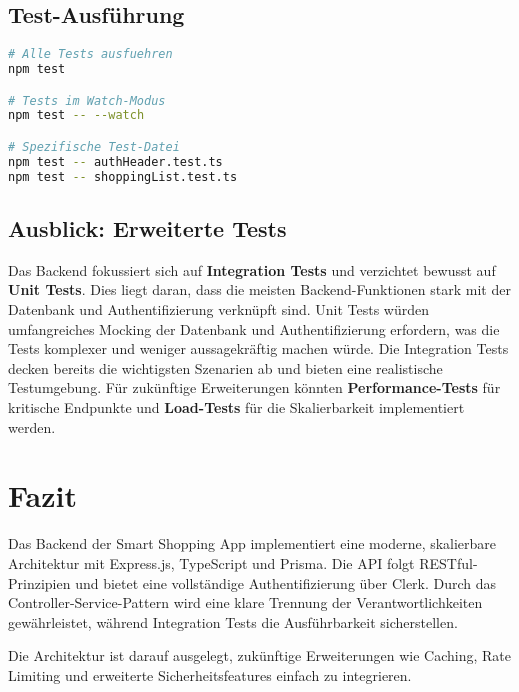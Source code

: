 \subsection{Test-Ausführung}

\begin{lstlisting}[language=bash,caption={Test-Befehle}]
# Alle Tests ausfuehren
npm test

# Tests im Watch-Modus
npm test -- --watch

# Spezifische Test-Datei
npm test -- authHeader.test.ts
npm test -- shoppingList.test.ts
\end{lstlisting}

\subsection{Ausblick: Erweiterte Tests}

Das Backend fokussiert sich auf \textbf{Integration Tests} und verzichtet bewusst auf \textbf{Unit Tests}. Dies liegt daran, dass die meisten Backend-Funktionen stark mit der Datenbank und Authentifizierung verknüpft sind. Unit Tests würden umfangreiches Mocking der Datenbank und Authentifizierung erfordern, was die Tests komplexer und weniger aussagekräftig machen würde. Die Integration Tests decken bereits die wichtigsten Szenarien ab und bieten eine realistische Testumgebung. Für zukünftige Erweiterungen könnten \textbf{Performance-Tests} für kritische Endpunkte und \textbf{Load-Tests} für die Skalierbarkeit implementiert werden.

\section{Fazit}

Das Backend der Smart Shopping App implementiert eine moderne, skalierbare Architektur mit Express.js, TypeScript und Prisma. Die API folgt RESTful-Prinzipien und bietet eine vollständige Authentifizierung über Clerk. Durch das Controller-Service-Pattern wird eine klare Trennung der Verantwortlichkeiten gewährleistet, während Integration Tests die Ausführbarkeit sicherstellen.

Die Architektur ist darauf ausgelegt, zukünftige Erweiterungen wie Caching, Rate Limiting und erweiterte Sicherheitsfeatures einfach zu integrieren.

\cleardoublepage

